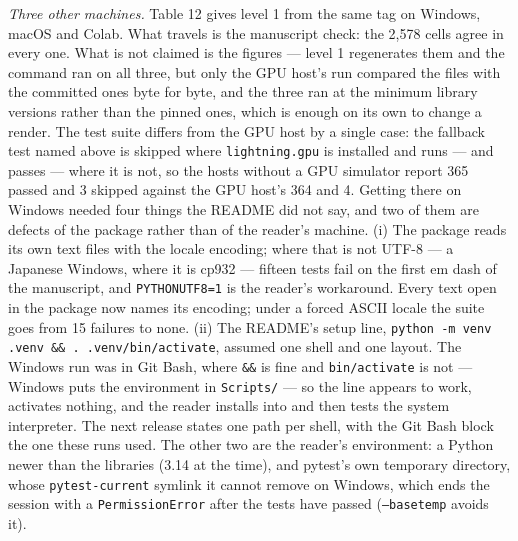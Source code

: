 \documentclass[acmsmall,screen,review]{acmart}
\begin{document}
\textit{Three other machines.} Table 12 gives level 1 from the same tag on Windows, macOS and Colab. What travels is the manuscript check: the 2,578 cells agree in every one. What is not claimed is the figures --- level 1 regenerates them and the command ran on all three, but only the GPU host's run compared the files with the committed ones byte for byte, and the three ran at the minimum library versions rather than the pinned ones, which is enough on its own to change a render. The test suite differs from the GPU host by a single case: the fallback test named above is skipped where \texttt{lightning.gpu} is installed and runs --- and passes --- where it is not, so the hosts without a GPU simulator report 365 passed and 3 skipped against the GPU host's 364 and 4. Getting there on Windows needed four things the README did not say, and two of them are defects of the package rather than of the reader's machine. (i) The package reads its own text files with the locale encoding; where that is not UTF-8 --- a Japanese Windows, where it is cp932 --- fifteen tests fail on the first em dash of the manuscript, and \texttt{PYTHONUTF8=1} is the reader's workaround. Every text open in the package now names its encoding; under a forced ASCII locale the suite goes from 15 failures to none. (ii) The README's setup line, \texttt{python -\allowbreak{}m venv .\allowbreak{}venv \&\& .\allowbreak{} .\allowbreak{}venv/\allowbreak{}bin/\allowbreak{}activate}, assumed one shell and one layout. The Windows run was in Git Bash, where \texttt{\&\&} is fine and \texttt{bin/activate} is not --- Windows puts the environment in \texttt{Scripts/} --- so the line appears to work, activates nothing, and the reader installs into and then tests the system interpreter. The next release states one path per shell, with the Git Bash block the one these runs used. The other two are the reader's environment: a Python newer than the libraries (3.14 at the time), and pytest's own temporary directory, whose \texttt{pytest-current} symlink it cannot remove on Windows, which ends the session with a \texttt{PermissionError} after the tests have passed (\texttt{--basetemp} avoids it).
\end{document}
